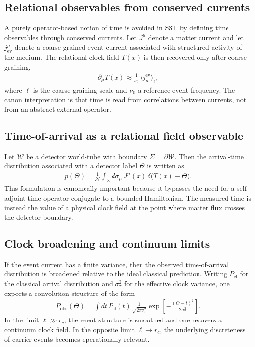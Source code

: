 \documentclass[11pt]{article}
\theoremstyle{definition}
\theoremstyle{plain}
\theoremstyle{remark}
\begin{document}
    \subsection{Relational observables from conserved currents}
        A purely operator-based notion of time is avoided in SST by defining time observables through conserved currents. Let $J^\mu$ denote a matter current and let $j_{\mathrm{ev}}^\mu$ denote a coarse-grained event current associated with structured activity of the medium. The relational clock field $T(x)$ is then recovered only after coarse graining,
        \begin{align}
            \partial_\mu T(x) \approx \frac{1}{\nu_0}\,\langle j^{\mathrm{ev}}_\mu \rangle_{\ell},
        \end{align}
        where $\ell$ is the coarse-graining scale and $\nu_0$ a reference event frequency. The canon interpretation is that time is read from correlations between currents, not from an abstract external operator.

    \subsection{Time-of-arrival as a relational field observable}
        Let $\mathcal{W}$ be a detector world-tube with boundary $\Sigma = \partial \mathcal{W}$. Then the arrival-time distribution associated with a detector label $\Theta$ is written as
        \begin{align}
            p(\Theta) = \frac{1}{\mathcal{N}} \int_{\Sigma} d\sigma_\mu \, J^\mu(x)\,\delta\!\big(T(x)-\Theta\big).
        \end{align}
        This formulation is canonically important because it bypasses the need for a self-adjoint time operator conjugate to a bounded Hamiltonian. The measured time is instead the value of a physical clock field at the point where matter flux crosses the detector boundary.

    \subsection{Clock broadening and continuum limits}
        If the event current has a finite variance, then the observed time-of-arrival distribution is broadened relative to the ideal classical prediction. Writing $P_{\mathrm{cl}}$ for the classical arrival distribution and $\sigma_\tau^2$ for the effective clock variance, one expects a convolution structure of the form
        \begin{align}
            P_{\mathrm{obs}}(\Theta)
            =
            \int dt\,P_{\mathrm{cl}}(t)
            \frac{1}{\sqrt{2\pi\sigma_\tau^2}}
            \exp\!\left[-\frac{(\Theta-t)^2}{2\sigma_\tau^2}\right].
        \end{align}
        In the limit $\ell \gg r_c$, the event structure is smoothed and one recovers a continuum clock field. In the opposite limit $\ell \to r_c$, the underlying discreteness of carrier events becomes operationally relevant.
\end{document}
